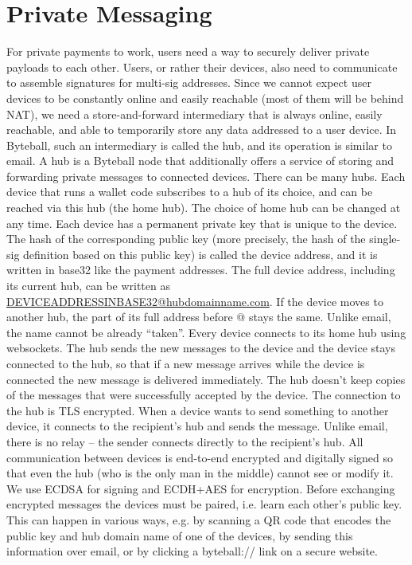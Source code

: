 \documentclass[a4paper, dvipdfmx]{jsarticle}
\begin{document}
\section{Private Messaging}
For private payments to work, users need a way to securely deliver private payloads to each other. Users, or rather their devices, also need to communicate to assemble signatures for multi-sig addresses.
Since we cannot expect user devices to be constantly online and easily reachable (most of them will be behind NAT), we need a store-and-forward intermediary that is always online, easily reachable, and able to temporarily store any data addressed to a user device.
In Byteball, such an intermediary is called the hub, and its operation is similar to email. A hub is a Byteball node that additionally offers a service of storing and forwarding private messages to connected devices. There can be many hubs. Each device that runs a wallet code subscribes to a hub of its choice, and can be reached via this hub (the home hub). The choice of home hub can be changed at any time. Each device has a permanent private key that is unique to the device. The hash of the corresponding public key (more precisely, the hash of the single-sig definition based on this public key) is called the device address, and it is written in base32 like the payment addresses. The full device address, including its current hub, can be written as \url{DEVICEADDRESSINBASE32@hubdomainname.com}. If the device moves to another hub, the part of its full address before @ stays the same. Unlike email, the name cannot be already “taken”.
Every device connects to its home hub using websockets. The hub sends the new messages to the device and the device stays connected to the hub, so that if a new message arrives while the device is connected the new message is delivered immediately. The hub doesn’t keep copies of the messages that were successfully accepted by the device. The connection to the hub is TLS encrypted.
When a device wants to send something to another device, it connects to the recipient’s hub and sends the message. Unlike email, there is no relay – the sender connects directly to the recipient’s hub. All communication between devices is end-to-end encrypted and digitally signed so that even the hub (who is the only man in the middle) cannot see or modify it. We use ECDSA for signing and ECDH+AES for encryption.
Before exchanging encrypted messages the devices must be paired, i.e. learn each other’s public key. This can happen in various ways, e.g. by scanning a QR code that encodes the public key and hub domain name of one of the devices, by sending this information over email, or by clicking a byteball:// link on a secure website.
\end{document}
